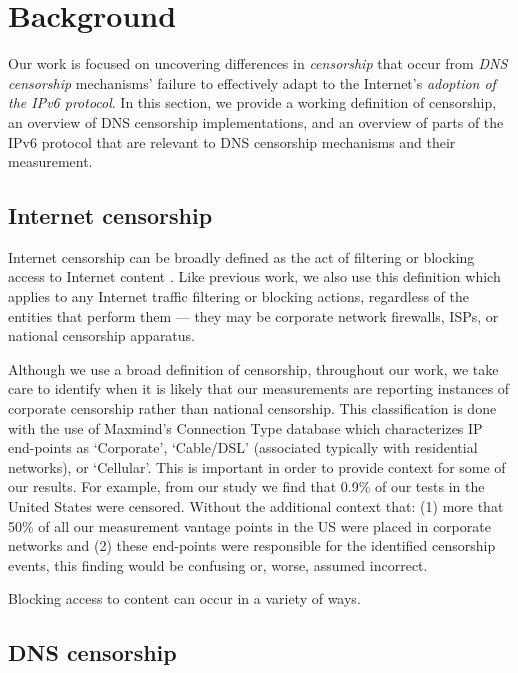 \section{Background}\label{sec:background}
Our work is focused on uncovering differences in {\em censorship} that occur
from {\em DNS censorship} mechanisms' failure to effectively adapt to the Internet's
{\em adoption of the IPv6 protocol}. 
%
In this section, we provide a working definition of censorship, an overview of
DNS censorship implementations, and an overview of parts of the IPv6 protocol
that are relevant to DNS censorship mechanisms and their measurement.

\subsection{Internet censorship}\label{sec:background:censorship}

Internet censorship can be broadly defined as the act of filtering or blocking
access to Internet content \cite{townsend}. Like previous work, we also use
this definition which applies to any Internet traffic filtering or blocking
actions, regardless of the entities that perform them --- \ie they may be
corporate network firewalls, ISPs, or national censorship apparatus.

Although we use a broad definition of censorship, throughout our work, we
take care to identify when it is likely that our measurements are reporting
instances of corporate censorship rather than national censorship. 
This classification is done with the use of Maxmind's
Connection Type database \cite{maxmind-connectiondb} which characterizes IP
end-points as `Corporate', `Cable/DSL' (associated typically with residential
networks), or `Cellular'.
%
This is important in order to provide context for some of our results.
For example, from our study we find that 0.9\% of our tests in the United
States were censored. Without the additional context that: (1) more that 50\%
of all our measurement vantage points in the US were placed in corporate
networks and (2) these end-points were responsible for the identified
censorship events, this finding would be confusing or, worse, assumed
incorrect. 

 Blocking access to content can occur in
a variety of ways. 

\subsection{DNS censorship}\label{sec:background:dns}


